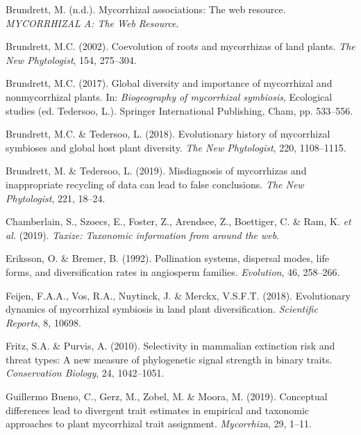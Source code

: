 \documentclass[12pt,]{article}
\begin{document}
\hypertarget{refs}{}
\leavevmode\hypertarget{ref-brundrett_website_2008}{}%
Brundrett, M. (n.d.). Mycorrhizal associations: The web resource.
\emph{MYCORRHIZAL A: The Web Resource}.

\leavevmode\hypertarget{ref-brundrett_2002}{}%
Brundrett, M.C. (2002). Coevolution of roots and mycorrhizas of land
plants. \emph{The New Phytologist}, 154, 275--304.

\leavevmode\hypertarget{ref-brundrett_2017}{}%
Brundrett, M.C. (2017). Global diversity and importance of mycorrhizal
and nonmycorrhizal plants. In: \emph{Biogeography of mycorrhizal
symbiosis}, Ecological studies (ed. Tedersoo, L.). Springer
International Publishing, Cham, pp. 533--556.

\leavevmode\hypertarget{ref-brundrett_2018}{}%
Brundrett, M.C. \& Tedersoo, L. (2018). Evolutionary history of
mycorrhizal symbioses and global host plant diversity. \emph{The New
Phytologist}, 220, 1108--1115.

\leavevmode\hypertarget{ref-brundrett_2019}{}%
Brundrett, M. \& Tedersoo, L. (2019). Misdiagnosis of mycorrhizas and
inappropriate recycling of data can lead to false conclusions. \emph{The
New Phytologist}, 221, 18--24.

\leavevmode\hypertarget{ref-chamberlain_2019}{}%
Chamberlain, S., Szoecs, E., Foster, Z., Arendsee, Z., Boettiger, C. \&
Ram, K. \emph{et al.} (2019). \emph{Taxize: Taxonomic information from
around the web}.

\leavevmode\hypertarget{ref-eriksson_1992}{}%
Eriksson, O. \& Bremer, B. (1992). Pollination systems, dispersal modes,
life forms, and diversification rates in angiosperm families.
\emph{Evolution}, 46, 258--266.

\leavevmode\hypertarget{ref-feijen_2018}{}%
Feijen, F.A.A., Vos, R.A., Nuytinck, J. \& Merckx, V.S.F.T. (2018).
Evolutionary dynamics of mycorrhizal symbiosis in land plant
diversification. \emph{Scientific Reports}, 8, 10698.

\leavevmode\hypertarget{ref-fritz_2010}{}%
Fritz, S.A. \& Purvis, A. (2010). Selectivity in mammalian extinction
risk and threat types: A new measure of phylogenetic signal strength in
binary traits. \emph{Conservation Biology}, 24, 1042--1051.

\leavevmode\hypertarget{ref-guillermobueno_2019}{}%
Guillermo Bueno, C., Gerz, M., Zobel, M. \& Moora, M. (2019). Conceptual
differences lead to divergent trait estimates in empirical and taxonomic
approaches to plant mycorrhizal trait assignment. \emph{Mycorrhiza}, 29,
1--11.
\end{document}
